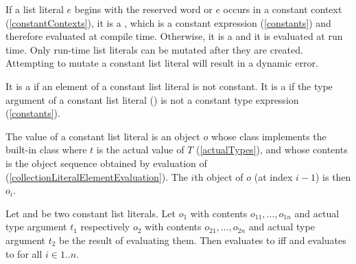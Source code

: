 \documentclass[makeidx]{article}
\begin{document}
{

\LMHash{}%
If a list literal $e$ begins with the reserved word \CONST{}
or $e$ occurs in a constant context
(\ref{constantContexts}),
it is a
,
which is a constant expression
(\ref{constants})
and therefore evaluated at compile time.
Otherwise, it is a
and it is evaluated at run time.
Only run-time list literals can be mutated
after they are created.
Attempting to mutate a constant list literal will result in a dynamic error.


\LMHash{}%
It is a 
if an element of a constant list literal is not constant.
It is a  if the type argument of a constant list literal
()
is not a constant type expression
(\ref{constants}).


\LMHash{}%
The value of a constant list literal
is an object $o$ whose class implements the built-in class
where $t$ is the actual value of $T$
(\ref{actualTypes}),
and whose contents is the object sequence  obtained by
evaluation of 
(\ref{collectionLiteralElementEvaluation}).
The $i$th object of $o$ (at index $i - 1$) is then $o_i$.

\LMHash{}%
Let 
and 
be two constant list literals.
Let $o_1$ with contents $o_{11}, \ldots, o_{1n}$ and actual type argument $t_1$
respectively
$o_2$ with contents $o_{21}, \ldots, o_{2n}$ and actual type argument $t_2$
be the result of evaluating them.
Then  evaluates to \TRUE{} if{}f
 and 
evaluates to \TRUE{} for all $i \in 1 .. n$.

}
\end{document}
